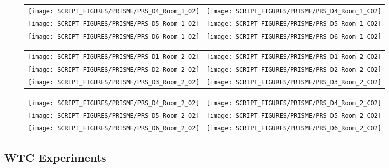 \begin{figure}[p]
\begin{tabular*}{\textwidth}{l@{\extracolsep{\fill}}r}
\texttt{[image: SCRIPT\_FIGURES/PRISME/PRS\_D4\_Room\_1\_O2]} &
\texttt{[image: SCRIPT\_FIGURES/PRISME/PRS\_D4\_Room\_1\_CO2]} \\
\texttt{[image: SCRIPT\_FIGURES/PRISME/PRS\_D5\_Room\_1\_O2]} &
\texttt{[image: SCRIPT\_FIGURES/PRISME/PRS\_D5\_Room\_1\_CO2]} \\
\texttt{[image: SCRIPT\_FIGURES/PRISME/PRS\_D6\_Room\_1\_O2]} &
\texttt{[image: SCRIPT\_FIGURES/PRISME/PRS\_D6\_Room\_1\_CO2]}
\end{tabular*}
\label{PRISME_Gas_2}
\end{figure}

\begin{figure}[p]
\begin{tabular*}{\textwidth}{l@{\extracolsep{\fill}}r}
\texttt{[image: SCRIPT\_FIGURES/PRISME/PRS\_D1\_Room\_2\_O2]} &
\texttt{[image: SCRIPT\_FIGURES/PRISME/PRS\_D1\_Room\_2\_CO2]} \\
\texttt{[image: SCRIPT\_FIGURES/PRISME/PRS\_D2\_Room\_2\_O2]} &
\texttt{[image: SCRIPT\_FIGURES/PRISME/PRS\_D2\_Room\_2\_CO2]} \\
\texttt{[image: SCRIPT\_FIGURES/PRISME/PRS\_D3\_Room\_2\_O2]} &
\texttt{[image: SCRIPT\_FIGURES/PRISME/PRS\_D3\_Room\_2\_CO2]}
\end{tabular*}
\label{PRISME_Gas_3}
\end{figure}

\begin{figure}[p]
\begin{tabular*}{\textwidth}{l@{\extracolsep{\fill}}r}
\texttt{[image: SCRIPT\_FIGURES/PRISME/PRS\_D4\_Room\_2\_O2]} &
\texttt{[image: SCRIPT\_FIGURES/PRISME/PRS\_D4\_Room\_2\_CO2]} \\
\texttt{[image: SCRIPT\_FIGURES/PRISME/PRS\_D5\_Room\_2\_O2]} &
\texttt{[image: SCRIPT\_FIGURES/PRISME/PRS\_D5\_Room\_2\_CO2]} \\
\texttt{[image: SCRIPT\_FIGURES/PRISME/PRS\_D6\_Room\_2\_O2]} &
\texttt{[image: SCRIPT\_FIGURES/PRISME/PRS\_D6\_Room\_2\_CO2]}
\end{tabular*}
\label{PRISME_Gas_4}
\end{figure}

\clearpage

\subsection{WTC Experiments}

